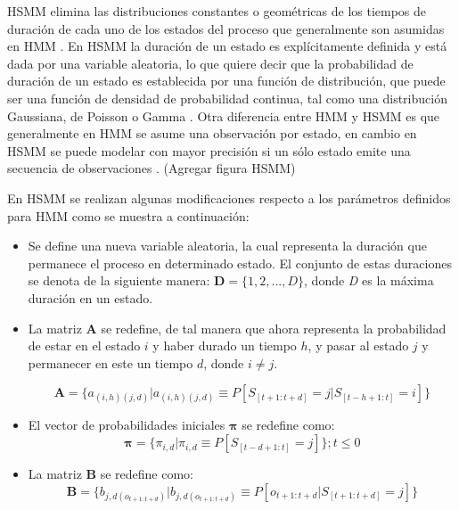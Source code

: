 HSMM elimina las distribuciones constantes o geométricas de los tiempos de duración de cada uno de los estados del proceso que generalmente son asumidas en HMM \cite{Yu2006}. En HSMM la duración de un estado es explícitamente definida y está dada por una variable aleatoria, lo que quiere decir que la probabilidad de duración de un estado es establecida por una función de distribución, que puede ser una función de densidad de probabilidad continua, tal como una distribución Gaussiana, de Poisson o Gamma \cite{Marhasev2006}. Otra diferencia entre HMM y HSMM es que generalmente en HMM se asume una observación por estado, en cambio en HSMM se puede modelar con mayor precisión si un sólo estado emite una secuencia de observaciones \cite{Yu2006,Yu2010}. (Agregar figura HSMM)

En HSMM se realizan algunas modificaciones respecto a los parámetros definidos para HMM como se muestra a continuación:

\begin{itemize}

    \item Se define una nueva variable aleatoria, la cual representa la duración que permanece el proceso en determinado estado. El conjunto de estas duraciones se denota de la siguiente manera: $\textbf{D} = \lbrace 1,2,...,D \rbrace$, donde \textit{D} es la máxima duración en un estado.

    \item La matriz \textbf{A} se redefine, de tal manera que ahora representa la probabilidad de estar en el estado $i$ y haber durado un tiempo $h$, y pasar al estado $j$ y permanecer en este un tiempo $d$, donde $i \neq j$. 
    
        \begin{equation}
            \textbf{A} = \lbrace a_{(i,h)(j,d)} \vert a_{(i,h)(j,d)} \equiv P \left[ S_{[t+1:t+d]} = j \vert S_{[t-h+1:t]} = i \right] \rbrace
        \end{equation}

    \item El vector de probabilidades iniciales $\boldsymbol\pi$ se redefine como:
        \begin{equation}
            \boldsymbol\pi = \lbrace \pi_{i,d} \vert \pi_{i,d} \equiv P \left[ S_{[t-d+1:t]} = j \right] \rbrace ; t \leqslant 0
        \end{equation}

    \item La matriz \textbf{B} se redefine como:
        \begin{equation}
            \textbf{B} = \lbrace b_{j,d(o_{t+1:t+d})} \vert b_{j,d(o_{t+1:t+d})} \equiv P \left[ o_{t+1:t+d} \vert S_{[t+1:t+d]} = j \right] \rbrace
    \end{equation}

\end{itemize}

